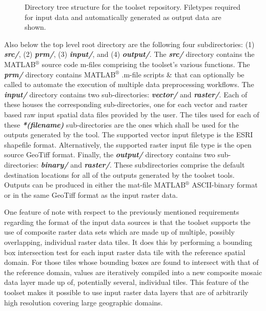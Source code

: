         \begin{figure}[!h]
            \caption{Directory tree structure for the toolset repository. Filetypes required for input data and automatically generated as output data are shown.}
              \label{fig:Directory}
        \end{figure}
        
Also below the top level root directory are the following four subdirectories: (1) \textit{\textbf{src/}}, (2) \textit{\textbf{prm/}}, (3) \textit{\textbf{input/}}, and (4) \textit{\textbf{output/}}. The \textit{\textbf{src/}} directory contains the MATLAB$^{\circledR}$ source code m-files comprising the toolset's various functions. The \textit{\textbf{prm/}} directory contains MATLAB$^{\circledR}$ .m-file scripts \& that can optionally be called to automate the execution of multiple data preprocessing workflows. The \textit{\textbf{input/}} directory contains two sub-directories: \textit{\textbf{vector/}} and \textit{\textbf{raster/}}. Each of these houses the corresponding sub-directories, one for each vector and raster based raw input spatial data files provided by the user. The tiles used for each of these \textit{\textbf{*(filename)}} sub-directories are the ones which shall be used for the outputs generated by the tool. The supported vector input filetype is the ESRI shapefile format. Alternatively, the supported raster input file type is the open source GeoTiff format. Finally, the \textit{\textbf{output/}} directory contains two sub-directories: \textit{\textbf{binary/}} and \textit{\textbf{raster/}}. These subdirectories comprise the default destination locations for all of the outputs generated by the toolset tools. Outputs can be produced in either the mat-file MATLAB$^{\circledR}$ ASCII-binary format or in the same GeoTiff format as the input raster data.

One feature of note with respect to the previously mentioned requirements regarding the format of the input data sources is that the toolset supports the use of composite raster data sets which are made up of multiple, possibly overlapping, individual raster data tiles. It does this by performing a bounding box intersection test for each input raster data tile with the reference spatial domain. For those tiles whose bounding boxes are found to intersect with that of the reference domain, values are iteratively compiled into a new composite mosaic data layer made up of, potentially several, individual tiles. This feature of the toolset makes it possible to use input raster data layers that are of arbitrarily high resolution covering large geographic domains.
    


